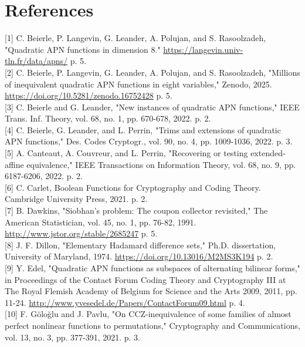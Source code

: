 \documentclass[10pt]{article}
\begin{document}
\section*{References}
[1] C. Beierle, P. Langevin, G. Leander, A. Polujan, and S. Rasoolzadeh, "Quadratic APN functions in dimension 8." \href{https://langevin.univ-tln.fr/data/apns/}{https://langevin.univ-tln.fr/data/apns/} p. 5.\\[0pt]
[2] C. Beierle, P. Langevin, G. Leander, A. Polujan, and S. Rasoolzadeh, "Millions of inequivalent quadratic APN functions in eight variables," Zenodo, 2025. \href{https://doi.org/10.5281/zenodo.16752428}{https://doi.org/10.5281/zenodo.16752428} p. 5.\\[0pt]
[3] C. Beierle and G. Leander, "New instances of quadratic APN functions," IEEE Trans. Inf. Theory, vol. 68, no. 1, pp. 670-678, 2022. p. 2.\\[0pt]
[4] C. Beierle, G. Leander, and L. Perrin, "Trims and extensions of quadratic APN functions," Des. Codes Cryptogr., vol. 90, no. 4, pp. 1009-1036, 2022. p. 3.\\[0pt]
[5] A. Canteaut, A. Couvreur, and L. Perrin, "Recovering or testing extended-affine equivalence," IEEE Transactions on Information Theory, vol. 68, no. 9, pp. 6187-6206, 2022. p. 2.\\[0pt]
[6] C. Carlet, Boolean Functions for Cryptography and Coding Theory. Cambridge University Press, 2021. p. 2.\\[0pt]
[7] B. Dawkins, "Siobhan's problem: The coupon collector revisited," The American Statistician, vol. 45, no. 1, pp. 76-82, 1991. \href{http://www.jstor.org/stable/2685247}{http://www.jstor.org/stable/2685247} p. 5.\\[0pt]
[8] J. F. Dillon, "Elementary Hadamard difference sets," Ph.D. dissertation, University of Maryland, 1974. \href{https://doi.org/10.13016/M2MS3K194}{https://doi.org/10.13016/M2MS3K194} p. 2.\\[0pt]
[9] Y. Edel, "Quadratic APN functions as subspaces of alternating bilinear forms," in Proceedings of the Contact Forum Coding Theory and Cryptography III at The Royal Flemish Academy of Belgium for Science and the Arts 2009, 2011, pp. 11-24. \href{http://www.yvesedel.de/Papers/ContactForum09.html}{http://www.yvesedel.de/Papers/ContactForum09.html} p. 4.\\[0pt]
[10] F. Göloğlu and J. Pavlu, "On CCZ-inequivalence of some families of almost perfect nonlinear functions to permutations," Cryptography and Communications, vol. 13, no. 3, pp. 377-391, 2021. p. 3.\\[0pt]
\end{document}
